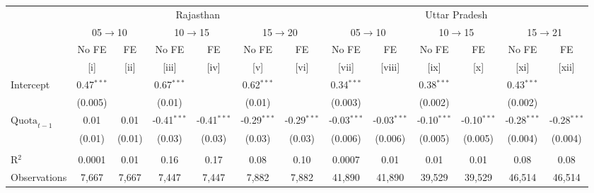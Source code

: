 
\begingroup
\centering
\scriptsize
\begin{adjustbox}{max width=\linewidth}
   \begin{threeparttable}[b]
      \begin{tabular}{lcccccccccccc}
         \toprule
          & \multicolumn{6}{c}{Rajasthan} & \multicolumn{6}{c}{Uttar Pradesh} \\ 
          & \multicolumn{2}{c}{05$\rightarrow$10} & \multicolumn{2}{c}{10$\rightarrow$15} & \multicolumn{2}{c}{15$\rightarrow$20} & \multicolumn{2}{c}{05$\rightarrow$10} & \multicolumn{2}{c}{10$\rightarrow$15} & \multicolumn{2}{c}{15$\rightarrow$21} \\ 
                               & No FE        & FE            & No FE         & FE            & No FE         & FE            & No FE         & FE            & No FE         & FE            & No FE         & FE \\   
                               & [i]          & [ii]          & [iii]         & [iv]          & [v]           & [vi]          & [vii]         & [viii]        & [ix]          & [x]           & [xi]          & [xii]\\  
         \midrule 
         Intercept             & 0.47$^{***}$ &               & 0.67$^{***}$  &               & 0.62$^{***}$  &               & 0.34$^{***}$  &               & 0.38$^{***}$  &               & 0.43$^{***}$  &   \\   
                               & (0.005)      &               & (0.01)        &               & (0.01)        &               & (0.003)       &               & (0.002)       &               & (0.002)       &   \\   
         $\text{Quota}_{t-1}$  & 0.01         & 0.01          & -0.41$^{***}$ & -0.41$^{***}$ & -0.29$^{***}$ & -0.29$^{***}$ & -0.03$^{***}$ & -0.03$^{***}$ & -0.10$^{***}$ & -0.10$^{***}$ & -0.28$^{***}$ & -0.28$^{***}$\\   
                               & (0.01)       & (0.01)        & (0.03)        & (0.03)        & (0.03)        & (0.03)        & (0.006)       & (0.006)       & (0.005)       & (0.005)       & (0.004)       & (0.004)\\   
          \\
         R$^2$                 & 0.0001       & 0.01          & 0.16          & 0.17          & 0.08          & 0.10          & 0.0007        & 0.01          & 0.01          & 0.01          & 0.08          & 0.08\\  
         Observations          & 7,667        & 7,667         & 7,447         & 7,447         & 7,882         & 7,882         & 41,890        & 41,890        & 39,529        & 39,529        & 46,514        & 46,514\\  

\end{tabular}
\end{threeparttable}
\end{adjustbox}
